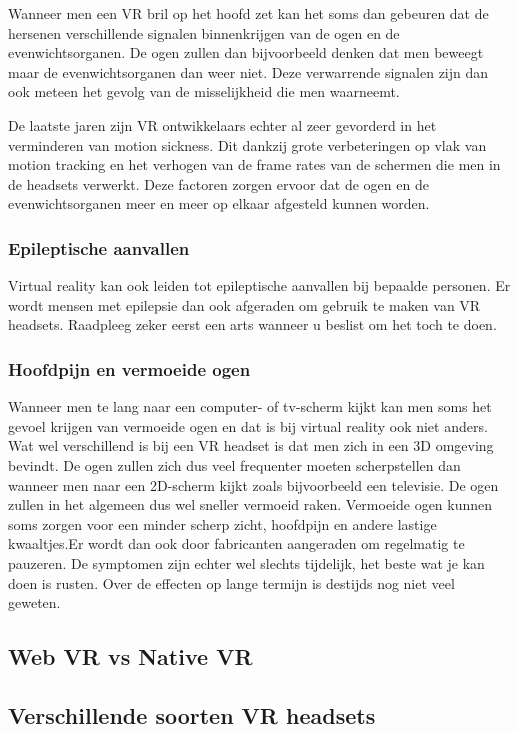 Wanneer men een VR bril op het hoofd zet kan het soms dan gebeuren dat de hersenen verschillende signalen binnenkrijgen van de ogen en de evenwichtsorganen. De ogen zullen dan bijvoorbeeld denken dat men beweegt maar de evenwichtsorganen dan weer niet. Deze verwarrende signalen zijn dan ook meteen het gevolg van de misselijkheid die men waarneemt. 


De laatste jaren zijn VR ontwikkelaars echter al zeer gevorderd in het verminderen van motion sickness. Dit dankzij grote verbeteringen op vlak van motion tracking en het verhogen van de frame rates van de schermen die men in de headsets verwerkt. Deze factoren zorgen ervoor dat de ogen en de evenwichtsorganen meer en meer op elkaar afgesteld kunnen worden.

\subsubsection{Epileptische aanvallen}
Virtual reality kan ook leiden tot epileptische aanvallen bij bepaalde personen. Er wordt mensen met epilepsie dan ook afgeraden om gebruik te maken van VR headsets. Raadpleeg zeker eerst een arts wanneer u beslist om het toch te doen.

\subsubsection{Hoofdpijn en vermoeide ogen}
Wanneer men te lang naar een computer- of tv-scherm kijkt kan men soms het gevoel krijgen van vermoeide ogen en dat is bij virtual reality ook niet anders. Wat wel verschillend is bij een VR headset is dat men zich in een 3D omgeving bevindt. De ogen zullen zich dus veel frequenter moeten scherpstellen dan wanneer men naar een 2D-scherm kijkt zoals bijvoorbeeld een televisie. De ogen zullen in het algemeen dus wel sneller vermoeid  raken. Vermoeide ogen kunnen soms zorgen voor een minder scherp zicht, hoofdpijn en andere lastige kwaaltjes.Er wordt dan ook door fabricanten aangeraden om regelmatig te pauzeren. De symptomen zijn echter wel slechts tijdelijk, het beste wat je kan doen is rusten. Over de effecten op lange termijn is destijds nog niet veel geweten.



\subsection{Web VR vs Native VR}

\subsection{Verschillende soorten VR headsets}
